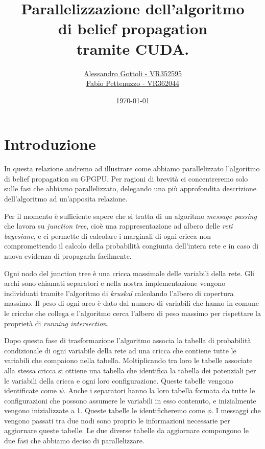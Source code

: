 \documentclass[a4paper]{article}   %
\begin{document}
\title{Parallelizzazione dell'algoritmo\\di belief propagation\\tramite CUDA.}   %
\author{\href{mailto:alessandro.gottoli@studenti.univr.it}{Alessandro Gottoli - VR352595} \\ \href{mailto:fabio.pettenuzzo@studenti.univr.it}{Fabio Pettenuzzo - VR362044}}
\date{\today}    %
\maketitle

\vspace{4cm}
\tableofcontents
\pagebreak




\section{Introduzione}             %
In questa relazione andremo ad illustrare come abbiamo parallelizzato l’algoritmo di belief propagation su GPGPU. Per ragioni di brevità ci concentreremo solo sulle fasi che abbiamo parallelizzato, delegando una più approfondita descrizione dell’algoritmo ad un’apposita relazione.

Per il momento è sufficiente sapere che si tratta di un algoritmo \emph{message passing} che lavora su \emph{junction tree}, cioè una rappresentazione ad albero delle \emph{reti bayesiane}, e ci permette di calcolare i marginali di ogni cricca non compromettendo il calcolo della probabilità congiunta dell'intera rete e in caso di nuova evidenza di propagarla facilmente.

Ogni nodo del junction tree è una cricca massimale delle variabili della rete. Gli archi sono chiamati separatori e nella nostra implementazione vengono individuati tramite l'algoritmo di \emph{kruskal} calcolando l'albero di copertura massimo. Il peso di ogni arco è dato dal numero di variabili che hanno in comune le cricche che collega e l'algoritmo cerca l'albero di peso massimo per rispettare la proprietà di \emph{running intersection}.

Dopo questa fase di trasformazione l'algoritmo associa la tabella di probabilità condizionale di ogni variabile della rete ad una cricca che contiene tutte le variabili che compaiono nella tabella. Moltiplicando tra loro le tabelle associate alla stessa cricca si ottiene una tabella che identifica la tabella dei potenziali per le variabili della cricca e ogni loro configurazione. Queste tabelle vengono identificate come $\psi$. Anche i separatori hanno la loro tabella formata da tutte le configurazioni che possono assumere le variabili in esso contenuto, e inizialmente vengono inizializzate a 1. Queste tabelle le identificheremo come $\phi$.
I messaggi che vengono passati tra due nodi sono proprio le informazioni necessarie per aggiornare queste tabelle.
Le due diverse tabelle da aggiornare compongono le due fasi che abbiamo deciso di parallelizzare.
\end{document}
